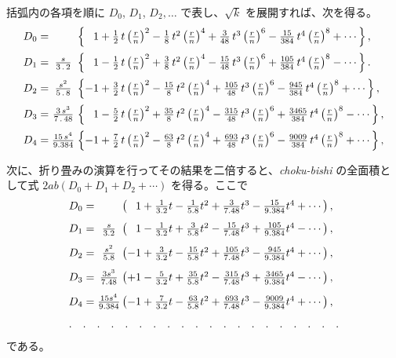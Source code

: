 \documentclass[11pt]{article}
\newcommand{\scanpage}[2]{\clearpage\setcounter{footnote}{0}\noindent{\footnotesize\color{gray}PDF #1 頁 · #2}\par\medskip}
\begin{document}
括弧内の各項を順に $D_0$, $D_1$, $D_2, \ldots$ で表し、$\sqrt{k}$ を展開すれば、次を得る。
\[
\begin{array}{@{}l@{\;}c@{\;}l@{}}
D_0 = & & \left\{\phantom{-}1 + \frac{1}{2}\,t\left(\frac{r}{n}\right)^{2} - \frac{1}{8}\,t^{2}\left(\frac{r}{n}\right)^{4} + \frac{3}{48}\,t^{3}\left(\frac{r}{n}\right)^{6} - \frac{15}{384}\,t^{4}\left(\frac{r}{n}\right)^{8} + \cdots\right\},\\[3mm]
D_1 = & \frac{s}{3\,.\,2} & \left\{\phantom{-}1 - \frac{1}{2}\,t\left(\frac{r}{n}\right)^{2} + \frac{3}{8}\,t^{2}\left(\frac{r}{n}\right)^{4} - \frac{15}{48}\,t^{3}\left(\frac{r}{n}\right)^{6} + \frac{105}{384}\,t^{4}\left(\frac{r}{n}\right)^{8} - \cdots\right\}.\\[3mm]
D_2 = & \frac{s^{2}}{5\,.\,8} & \left\{-1 + \frac{3}{2}\,t\left(\frac{r}{n}\right)^{2} - \frac{15}{8}\,t^{2}\left(\frac{r}{n}\right)^{4} + \frac{105}{48}\,t^{3}\left(\frac{r}{n}\right)^{6} - \frac{945}{384}\,t^{4}\left(\frac{r}{n}\right)^{8} + \cdots\right\},\\[3mm]
D_3 = & \frac{3\,s^{3}}{7\,.\,48} & \left\{\phantom{-}1 - \frac{5}{2}\,t\left(\frac{r}{n}\right)^{2} + \frac{35}{8}\,t^{2}\left(\frac{r}{n}\right)^{4} - \frac{315}{48}\,t^{3}\left(\frac{r}{n}\right)^{6} + \frac{3465}{384}\,t^{4}\left(\frac{r}{n}\right)^{8} - \cdots\right\},\\[3mm]
D_4 = & \frac{15\,s^{4}}{9.384} & \left\{-1 + \frac{7}{2}\,t\left(\frac{r}{n}\right)^{2} - \frac{63}{8}\,t^{2}\left(\frac{r}{n}\right)^{4} + \frac{693}{48}\,t^{3}\left(\frac{r}{n}\right)^{6} - \frac{9009}{384}\,t^{4}\left(\frac{r}{n}\right)^{8} + \cdots\right\},
\end{array}
\]
\noindent\dotfill

\scanpage{0332}{印刷頁 318}
次に、折り畳みの演算を行ってその結果を二倍すると、\emph{choku-bishi} の全面積として式 $2ab(D_0+D_1+D_2+\cdots)$ を得る。ここで
\[
\begin{array}{r@{}c@{\,}l}
D_0={} & & \left(\phantom{-}1+\frac{1}{3.2}t-\frac{1}{5.8}t^2+\frac{3}{7.48}t^3-\frac{15}{9.384}t^4+\cdots\right),\\[3mm]
D_1={} & \frac{s}{3.2} & \left(\phantom{-}1-\frac{1}{3.2}t+\frac{3}{5.8}t^2-\frac{15}{7.48}t^3+\frac{105}{9.384}t^4-\cdots\right),\\[3mm]
D_2={} & \frac{s^2}{5.8} & \left(-1+\frac{3}{3.2}t-\frac{15}{5.8}t^2+\frac{105}{7.48}t^3-\frac{945}{9.384}t^4+\cdots\right),\\[3mm]
D_3={} & \frac{3s^3}{7.48} & \left(+1-\frac{5}{3.2}t+\frac{35}{5.8}t^2-\frac{315}{7.48}t^3+\frac{3465}{9.384}t^4-\cdots\right),\\[3mm]
D_4={} & \frac{15s^4}{9.384} & \left(-1+\frac{7}{3.2}t-\frac{63}{5.8}t^2+\frac{693}{7.48}t^3-\frac{9009}{9.384}t^4+\cdots\right),\\[3mm]
\multicolumn{3}{l}{.\quad.\quad.\quad.\quad.\quad.\quad.\quad.\quad.\quad.\quad.\quad.\quad.\quad.\quad.\quad.\quad.\quad.\quad.\quad.}
\end{array}
\]
である。
\end{document}
